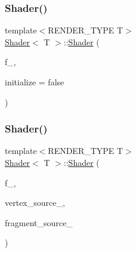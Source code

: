\mbox{\label{classShader_a0da5865af1f708cd63a66f3fd8cd69b8}} 
\subsubsection{\texorpdfstring{Shader()}{Shader()}\hspace{0.1cm}{\footnotesize\ttfamily [5/8]}}
{\footnotesize\ttfamily template$<$R\+E\+N\+D\+E\+R\+\_\+\+T\+Y\+PE T$>$ \\
\mbox{\hyperlink{classShader}{Shader}}$<$ T $>$\+::\mbox{\hyperlink{classShader}{Shader}} (\begin{DoxyParamCaption}\item[{Q\+Open\+G\+L\+Functions $\ast$}]{f\+\_\+,  }\item[{bool}]{initialize = {\ttfamily false} }\end{DoxyParamCaption})\hspace{0.3cm}{\ttfamily [inline]}}

\mbox{\label{classShader_a934bb76fa1a2c18d454d85d842d0792b}} 
\subsubsection{\texorpdfstring{Shader()}{Shader()}\hspace{0.1cm}{\footnotesize\ttfamily [6/8]}}
{\footnotesize\ttfamily template$<$R\+E\+N\+D\+E\+R\+\_\+\+T\+Y\+PE T$>$ \\
\mbox{\hyperlink{classShader}{Shader}}$<$ T $>$\+::\mbox{\hyperlink{classShader}{Shader}} (\begin{DoxyParamCaption}\item[{Q\+Open\+G\+L\+Functions $\ast$}]{f\+\_\+,  }\item[{const std\+::array$<$ std\+::string, 3 $>$}]{vertex\+\_\+source\+\_\+,  }\item[{const std\+::string}]{fragment\+\_\+source\+\_\+ }\end{DoxyParamCaption})\hspace{0.3cm}{\ttfamily [inline]}}

\mbox{\label{classShader_a7e30078f161d1c9f48a7b3921c01f816}} 
